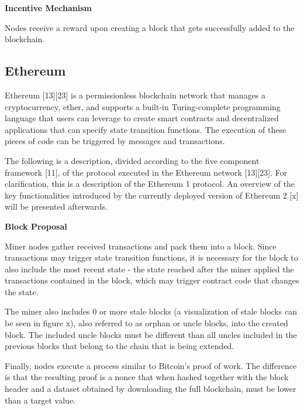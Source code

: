 \vspace{0.25cm}

\textbf{Incentive Mechanism}

Nodes receive a reward upon creating a block that gets successfully added to the blockchain.





\subsection{Ethereum}

Ethereum [13][23] is a permissionless blockchain network that manages a cryptocurrency, ether, and supports a built-in Turing-complete programming language that users can leverage to create smart contracts and decentralized applications that can specify state transition functions. The execution of these pieces of code can be triggered by messages and transactions.

The following is a description, divided according to the five component framework [11], of the protocol executed in the Ethereum network [13][23]. For clarification, this is a description of the Ethereum 1 protocol. An overview of the key functionalities introduced by the currently deployed version of Ethereum 2 [x] will be presented afterwards.

\vspace{0.5cm}

\textbf{Block Proposal}

Miner nodes gather received transactions and pack them into a block. Since transactions may trigger state transition functions, it is necessary for the block to also include the most recent state - the state reached after the miner applied the transactions contained in the block, which may trigger contract code that changes the state.

The miner also includes 0 or more stale blocks (a visualization of stale blocks can be seen in figure x), also referred to as orphan or uncle blocks, into the created block. The included uncle blocks must be different than all uncles included in the previous blocks that belong to the chain that is being extended.

Finally, nodes execute a process similar to Bitcoin’s proof of work. The difference is that the resulting proof is a nonce that when hashed together with the block header and a dataset obtained by downloading the full blockchain, must be lower than a target value.

